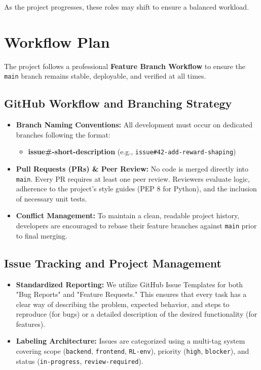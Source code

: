 \documentclass{article}
\begin{document}
As the project progresses, these roles may shift to ensure a balanced workload.


\section{Workflow Plan}


The project follows a professional \textbf{Feature Branch Workflow} to ensure the \texttt{main} branch remains stable, deployable, and verified at all times.

\subsection{GitHub Workflow and Branching Strategy}
\begin{itemize}
    \item \textbf{Branch Naming Conventions:} All development must occur on dedicated branches following the format:
    \begin{itemize}
      \item \textbf{issue\#-short-description} (e.g., \texttt{issue\#42-add-reward-shaping})
    \end{itemize}
    \item \textbf{Pull Requests (PRs) \& Peer Review:} No code is merged directly into \texttt{main}. Every PR requires at least one peer review. Reviewers evaluate logic, adherence to the project's style guides (PEP 8 for Python), and the inclusion of necessary unit tests.
    \item \textbf{Conflict Management:} To maintain a clean, readable project history, developers are encouraged to rebase their feature branches against \texttt{main} prior to final merging.
\end{itemize}

\subsection{Issue Tracking and Project Management}
\begin{itemize}
    \item \textbf{Standardized Reporting:} We utilize GitHub Issue Templates for both "Bug Reports" and "Feature Requests." This ensures that every task has a clear way of describing the problem, expected behavior, and steps to reproduce (for bugs) or a detailed description of the desired functionality (for features).
    \item \textbf{Labeling Architecture:} Issues are categorized using a multi-tag system covering scope (\texttt{backend}, \texttt{frontend}, \texttt{RL-env}), priority (\texttt{high}, \texttt{blocker}), and status (\texttt{in-progress}, \texttt{review-required}).
\end{itemize}
\end{document}
